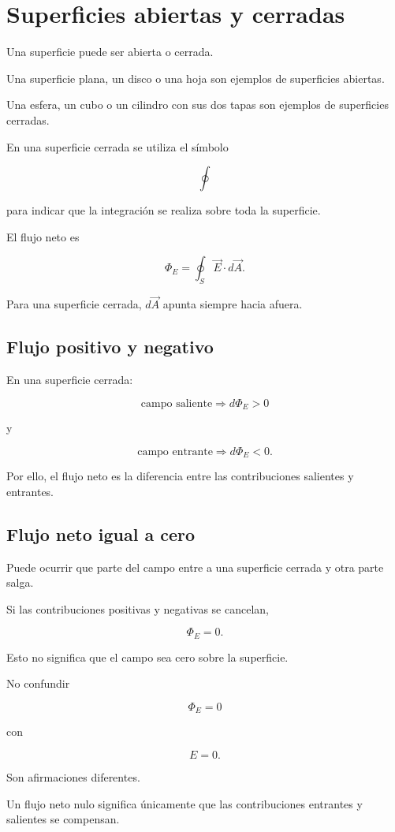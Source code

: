 \section{Superficies abiertas y cerradas}

Una superficie puede ser abierta o cerrada.

Una superficie plana, un disco o una hoja son ejemplos de superficies abiertas.

Una esfera, un cubo o un cilindro con sus dos tapas son ejemplos de superficies cerradas.

En una superficie cerrada se utiliza el símbolo

\[
\oint
\]

para indicar que la integración se realiza sobre toda la superficie.

El flujo neto es

\begin{equation}
\boxed{
\Phi_E=\oint_S\vec E\cdot d\vec A
}.
\label{eq:flujo_superficie_cerrada}
\end{equation}

Para una superficie cerrada, \(d\vec A\) apunta siempre hacia afuera.


\subsection{Flujo positivo y negativo}

En una superficie cerrada:

\[
\boxed{\text{campo saliente}\Longrightarrow d\Phi_E>0}
\]

y

\[
\boxed{\text{campo entrante}\Longrightarrow d\Phi_E<0}.
\]

Por ello, el flujo neto es la diferencia entre las contribuciones salientes y entrantes.


\subsection{Flujo neto igual a cero}

Puede ocurrir que parte del campo entre a una superficie cerrada y otra parte salga.

Si las contribuciones positivas y negativas se cancelan,

\[
\Phi_E=0.
\]

Esto no significa que el campo sea cero sobre la superficie.

\begin{errorfrecuente}

No confundir

\[
\boxed{\Phi_E=0}
\]

con

\[
\boxed{E=0}.
\]

Son afirmaciones diferentes.

Un flujo neto nulo significa únicamente que las contribuciones entrantes y salientes
se compensan.

\end{errorfrecuente}


